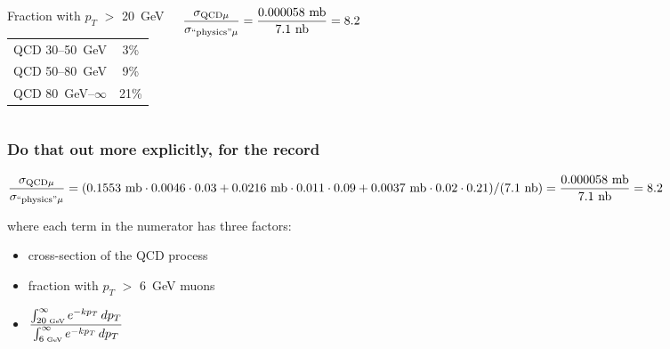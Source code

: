 \documentclass[compress]{beamer}
\begin{document}
\begin{frame}
\begin{columns}
\begin{center}
Fraction with $p_T$ $>$ 20~GeV
\begin{tabular}{c c}
QCD 30--50~GeV & 3\% \\
QCD 50--80~GeV & 9\% \\
QCD 80~GeV--$\infty$ & 21\% \\
\end{tabular}
\end{center}

$\displaystyle \frac{\sigma_{\mbox{\scriptsize QCD} \mu}}{\sigma_{\mbox{\scriptsize ``physics''} \mu}} = \frac{0.000058 \mbox{ mb}}{7.1 \mbox{ nb}} = 8.2$

\end{columns}
\end{frame}

\begin{frame}
\frametitle{Do that out more explicitly, for the record}

$\displaystyle \frac{\sigma_{\mbox{\scriptsize QCD} \mu}}{\sigma_{\mbox{\scriptsize ``physics''} \mu}} = (0.1553\mbox{ mb} \cdot 0.0046 \cdot 0.03 + 0.0216\mbox{ mb} \cdot 0.011 \cdot 0.09 + 0.0037\mbox{ mb} \cdot 0.02 \cdot 0.21) / (7.1\mbox{ nb}) = \frac{0.000058 \mbox{ mb}}{7.1 \mbox{ nb}} = 8.2$

\vfill
where each term in the numerator has three factors:
\begin{itemize}
\item cross-section of the QCD process
\item fraction with $p_T$ $>$ 6~GeV muons
\item $\displaystyle \frac{\int_{20\mbox{\tiny\ GeV}}^\infty e^{-k p_T} \, dp_T}{\int_{6\mbox{\tiny\ GeV}}^\infty e^{-k p_T} \, dp_T}$
\end{itemize}


\end{frame}
\end{document}
